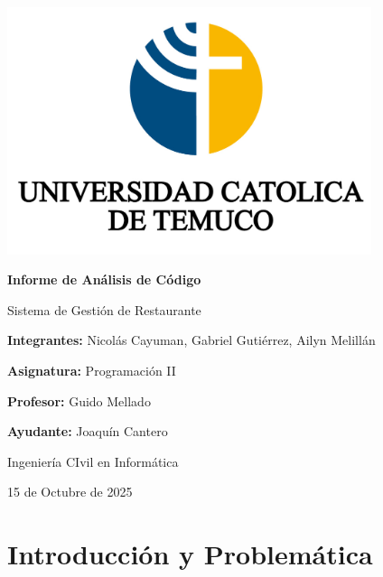 \documentclass[a4paper, 12pt]{article}
\begin{document}
\begin{titlepage}
    \centering
    \vspace*{2cm} 
    
    \includegraphics[width=0.8\textwidth]{images/logo_uct.jpg} 

    \vspace{2cm}
    {\Huge \textbf{Informe de Análisis de Código}}
    
    \vspace{0.5cm}
    {\huge Sistema de Gestión de Restaurante}
    
    \vfill
    
    {\Large \textbf{Integrantes:} Nicolás Cayuman, Gabriel Gutiérrez, Ailyn Melillán}
    
    \vspace{0.5cm}
    {\Large \textbf{Asignatura:} Programación II}
    
    \vspace{0.5cm}
    {\Large \textbf{Profesor:} Guido Mellado}
    
    \vspace{0.5cm}
    {\Large \textbf{Ayudante:} Joaquín Cantero}

    \vspace{0.5cm}
    {\Large Ingeniería CIvil en Informática}
    
    \vspace{0.5cm}
    {\Large 15 de Octubre de 2025} 
    
    \vspace{1cm}
\end{titlepage}
\thispagestyle{empty} 
\newpage

\tableofcontents

\newpage

\section{Introducción y Problemática}
\end{document}

